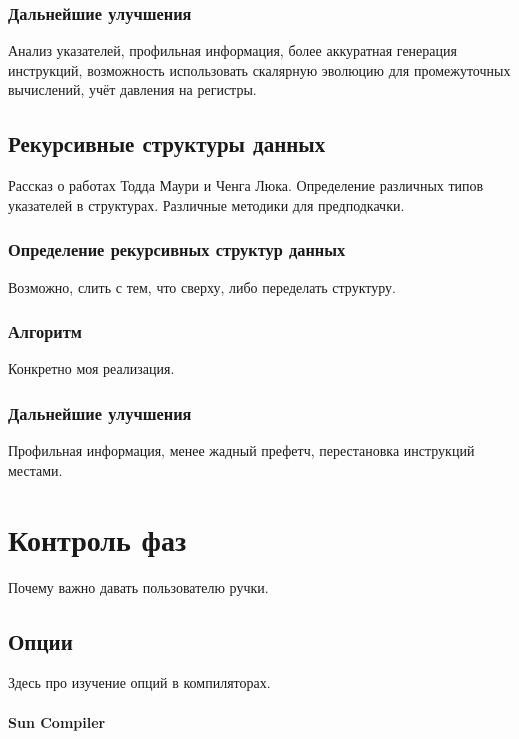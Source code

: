 \documentclass[12pt,a4paper]{article}
\begin{document}
\subsubsection{Дальнейшие улучшения}

Анализ указателей, профильная информация, более аккуратная генерация инструкций, возможность использовать скалярную эволюцию для промежуточных вычислений, учёт давления на регистры.

\subsection{Рекурсивные структуры данных}

Рассказ о работах Тодда Маури и Ченга Люка. Определение различных типов указателей в структурах. Различные методики для предподкачки.

\subsubsection{Определение рекурсивных структур данных}

Возможно, слить с тем, что сверху, либо переделать структуру.

\subsubsection{Алгоритм}

Конкретно моя реализация.

\subsubsection{Дальнейшие улучшения}

Профильная информация, менее жадный префетч, перестановка инструкций местами.

\section{Контроль фаз}

Почему важно давать пользователю ручки.

\subsection{Опции}

Здесь про изучение опций в компиляторах.

\paragraph{Sun Compiler}
\end{document}
